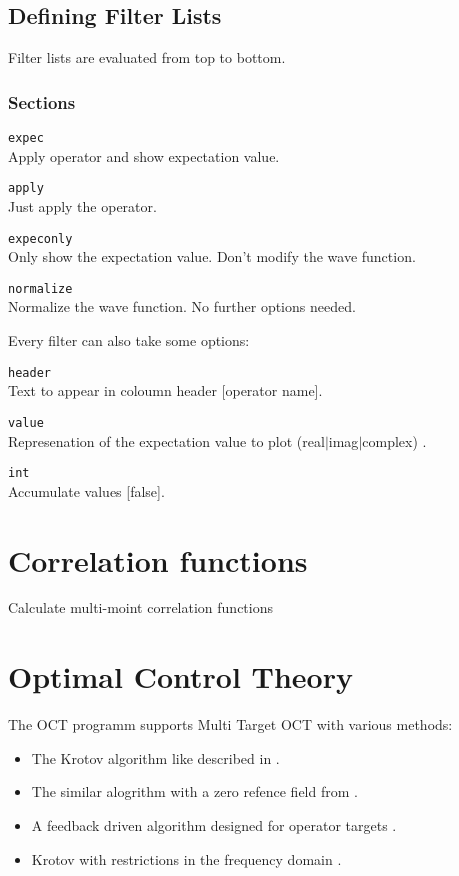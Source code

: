 \documentclass[a4paper,12pt]{scrbook}
\newcommand{\option}[2]{\item \texttt{#1}\\ #2}
\begin{document}
\subsection{Defining Filter Lists}
\label{sec:Filters}
Filter lists are evaluated from top to bottom.

\subsubsection*{Sections}
\begin{options}
\option{expec}{Apply operator and show expectation value.}
\option{apply}{Just apply the operator.}
\option{expeconly}{Only show the expectation value. Don't modify the wave function.}
\option{normalize}{Normalize the wave function. No further options needed.}
\end{options}

Every filter can also take some options:
\begin{options}
\option{header}{Text to appear in coloumn header [operator name].}
\option{value}{Represenation of the expectation value to plot (real$|$imag$|$complex) .}
\option{int}{Accumulate values [false].}
\end{options}


\section{Correlation functions}
Calculate multi-moint correlation functions

\section{Optimal Control Theory}
The OCT programm supports Multi Target OCT with various methods:
\begin{itemize}
 \item The Krotov algorithm like described in \cite{Palao03}.
 \item The similar alogrithm with a zero refence field from \cite{Zhu98}.
 \item A feedback driven algorithm designed for operator targets \cite{Zhu98FB}.
 \item Krotov with restrictions in the frequency domain \cite{Gollub08,Gollub10}.
\end{itemize}
\end{document}
